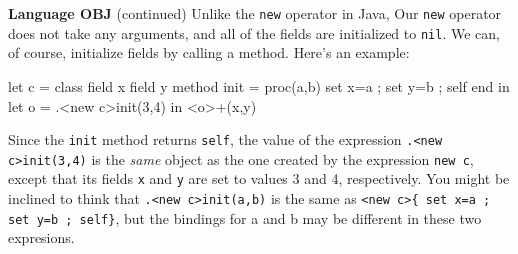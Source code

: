 \begin{minipage}[t]{\sw}
\slidenumber
\LARGE
{\bf Language OBJ} (continued)\exx
Unlike the \verb'new' operator in Java,
Our \verb'new' operator does not take any arguments,
and all of the fields are initialized to \verb'nil'.
We can, of course, initialize fields by calling a method.
Here's an example:
\Large
\begin{qv}
let
  c = class
        field x
        field y
        method init = proc(a,b) { set x=a ; set y=b ; self }
      end
  in
    let
      o = .<new c>init(3,4)
    in
      <o>+(x,y) %
\end{qv}
\LARGE
Since the \verb'init' method returns \verb'self',
the value of the expression \verb'.<new c>init(3,4)'
is the {\em same} object as the one created by the expression \verb'new c',
except that its fields \verb'x' and \verb'y' are set
to values 3 and 4, respectively.\exx
You might be inclined to think that \verb'.<new c>init(a,b)'
is the same as \verb'<new c>{ set x=a ; set y=b ; self}',
but the bindings for a and b may be different in these two expresions.

\end{minipage}
